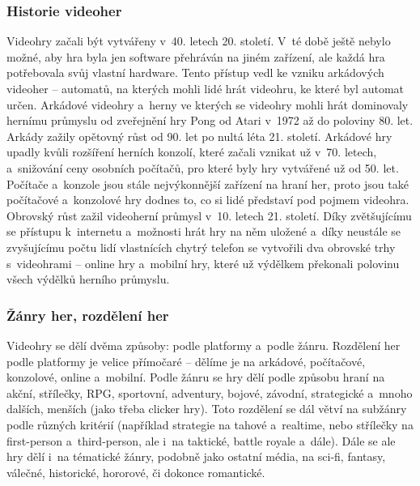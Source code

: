 \documentclass[a4paper]{extarticle}
\begin{document}
\subsubsection{Historie videoher}
Videohry začali být vytvářeny v~40. letech 20. století. V~té době ještě nebylo možné, aby hra byla jen software přehráván na jiném zařízení, ale každá hra potřebovala svůj vlastní hardware. Tento přístup vedl ke vzniku arkádových videoher – automatů, na kterých mohli lidé hrát videohru, ke které byl automat určen. Arkádové videohry a~herny ve kterých se videohry mohli hrát dominovaly hernímu průmyslu od zveřejnění hry Pong od Atari v~1972 až do poloviny 80. let. Arkády zažily opětovný růst od 90. let po nultá léta 21. století.
Arkádové hry upadly kvůli rozšíření herních konzolí, které začali vznikat už v~70. letech, a~snižování ceny osobních počítačů, pro které byly hry vytvářené už od 50. let. Počítače a~konzole jsou stále nejvýkonnější zařízení na hraní her, proto jsou také počítačové a~konzolové hry dodnes to, co si lidé představí pod pojmem videohra.
Obrovský růst zažil videoherní průmysl v~10. letech 21. století. Díky zvětšujícímu se přístupu k~internetu a~možnosti hrát hry na něm uložené a~díky neustále se zvyšujícímu počtu lidí vlastnících chytrý telefon se vytvořili dva obrovské trhy s~videohrami – online hry a~mobilní hry, které už výdělkem překonali polovinu všech výdělků herního průmyslu. \cite{games_revenue}
\subsubsection{Žánry her, rozdělení her}
Videohry se dělí dvěma způsoby: podle platformy a~podle žánru.
Rozdělení her podle platformy je velice přímočaré – dělíme je na arkádové, počítačové, konzolové, online a~mobilní.
Podle žánru se hry dělí podle způsobu hraní na akční, střílečky, RPG, sportovní, adventury, bojové, závodní, strategické a~mnoho dalších, menších (jako třeba clicker hry). Toto rozdělení se dál větví na subžánry podle různých kritérií (například strategie na tahové a~realtime, nebo střílečky na first-person a~third-person, ale i~na taktické, battle royale a~dále). Dále se ale hry dělí i~na tématické žánry, podobně jako ostatní média, na sci-fi, fantasy, válečné, historické, hororové, či dokonce romantické.
\end{document}
